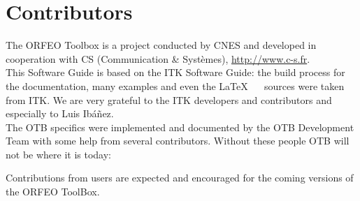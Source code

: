 \chapter{Contributors}
\noindent

The ORFEO Toolbox is a project conducted by CNES and developed in
cooperation with CS (Communication \& Syst\`{e}mes), \url{http://www.c-s.fr}.\\

This Software Guide is based on the ITK Software Guide: the build
process for the documentation, many examples and even the \LaTeX~ ~
sources were taken from ITK. We are very grateful to the ITK
developers and contributors and especially to Luis Ib\'a\~nez.\\

The OTB specifics were implemented and documented by the OTB Development Team with some help from several contributors. Without these people OTB will not be where it is today:



Contributions from users are expected and encouraged for the coming
versions of the ORFEO ToolBox.

